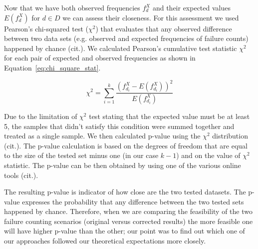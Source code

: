 \documentclass[
  digital,  	%
  color,		%
  oneside,   	%
  12pt,
  nocover,
  notable,
  nolof,
  nolot,
]{fithesis3}
\theoremstyle{definition}
\theoremstyle{remark}
\begin{document}
Now that we have both observed frequencies $f_{d}^{X}$ and their expected values $E\left(f_{d}^{X}\right)$ for $d \in D$ we can assess their closeness. For this assessment we used Pearson's chi-squared test ($\chi^2$) that evaluates that any observed difference between two data sets (e.g. observed and expected frequencies of failure counts) happened by chance (cit.). We calculated Pearson's cumulative test statistic $\chi^2$ for each pair of expected and observed frequencies as shown in Equation~\ref{eq:chi_square_stat}.

\begin{equation}
\label{eq:chi_square_stat}
\chi^2 = \sum\limits_{i=1}^{k} \frac{  \left(f_{d_i}^{X} - E \left(f_{d_i}^{X}\right) \right)^2 }{E \left(f_{d_i}^{X}\right)}
\end{equation}

Due to the limitation of $\chi^2$ test stating that the expected value must be at least 5, the samples that didn't satisfy this condition were summed together and treated as a single sample. We then calculated p-value using the $\chi^2$ distribution (cit.). The p-value calculation is based on the degrees of freedom that are equal to the size of the tested set minus one (in our case $k-1$) and on the value of $\chi^2$ statistic. The p-value can be then obtained by using one of the various online tools (cit.). 

The resulting p-value is indicator of how close are the two tested datasets. The p-value expresses the probability that any difference between the two tested sets happened by chance. Therefore, when we are comparing the feasibility of the two failure counting scenarios (original versus corrected results) the more feasible one will have higher p-value than the other; our point was to find out which one of our approaches followed our theoretical expectations more closely.
\end{document}
